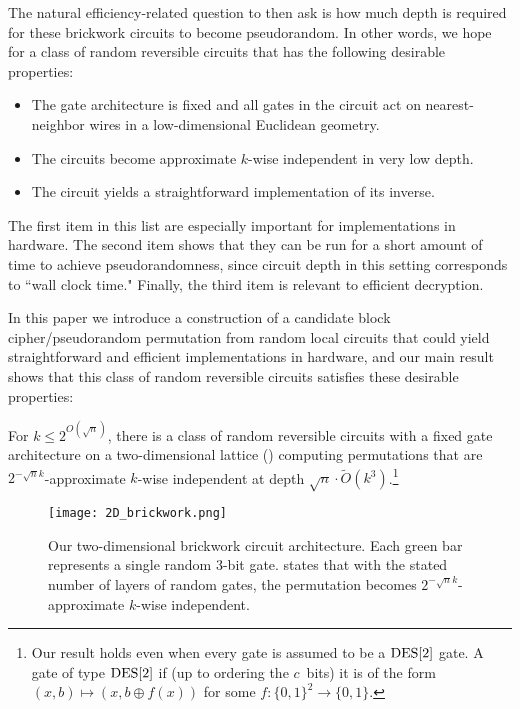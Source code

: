 

The natural efficiency-related question to then ask is how much depth is required for these brickwork circuits to become pseudorandom. In other words, we hope for a class of random reversible circuits that has the following desirable properties:
\begin{itemize}
    \item The gate architecture is fixed and all gates in the circuit act on nearest-neighbor wires in a low-dimensional Euclidean geometry.
    \item The circuits become approximate $k$-wise independent in very low depth.
    \item The circuit yields a straightforward implementation of its inverse.
\end{itemize}
The first item in this list are especially important for implementations in hardware. The second item shows that they can be run for a short amount of time to achieve pseudorandomness, since circuit depth in this setting corresponds to ``wall clock time." Finally, the third item is relevant to efficient decryption. 

In this paper we introduce a construction of a candidate block cipher/pseudorandom permutation from random local circuits that could yield straightforward and efficient implementations in hardware, and our main result shows that this class of random reversible circuits satisfies these desirable properties:
\begin{theorem}\label{thm:2D main}
    For $k \leq 2^{O(\sqrt{n})}$, there is a class of random reversible circuits with a fixed gate architecture on a two-dimensional lattice () computing permutations that are $2^{-\sqrt{n}k}$-approximate $k$-wise independent at depth $\sqrt{n} \cdot \widetilde{O}(k^3)$.\footnote{Our result holds even when every gate is assumed to be a $\mathrm{DES}[2]$ gate. A gate of type $\mathrm{DES}[2]$ if (up to ordering the $c$~bits) it is of the form $(x,b) \mapsto (x,b \oplus f(x))$ for some $f : \{0,1\}^{2} \to \{0,1\}$.}
\end{theorem}
\begin{figure}[t]
    \centering
    \texttt{[image: 2D\_brickwork.png]}
    \caption{Our two-dimensional brickwork circuit architecture. Each green bar represents a single random 3-bit gate.  states that with the stated number of layers of random gates, the permutation becomes $2^{-\sqrt{n}k}$-approximate $k$-wise independent.}
    \label{fig:2D brickwork}
\end{figure}


